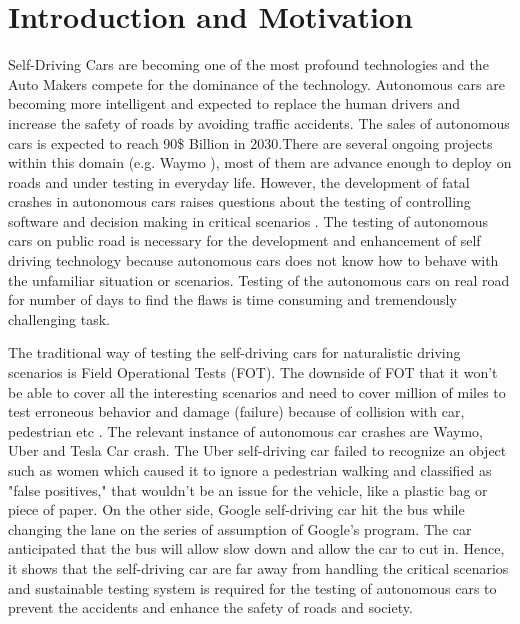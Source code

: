 \section{Introduction and Motivation}
Self-Driving Cars are becoming one of the most profound technologies and the Auto Makers compete for the dominance of the technology\cite{hancock2019future}. Autonomous cars are becoming more intelligent and expected to replace the human drivers and increase the safety of roads by avoiding traffic accidents. The sales of autonomous cars is expected to reach 90\$ Billion in 2030\cite{bertoncello2015ten}\cite{keeney2017mobility}.There are several ongoing projects within this domain (e.g. Waymo \cite{teoh2017rage}), most of them are advance enough to deploy on roads and under testing in everyday life. However, the development of fatal crashes in autonomous cars raises questions about the testing of controlling software and decision making in critical scenarios \cite{zhou2017identification}. The testing of autonomous cars on public road is necessary for the development and enhancement of self driving technology because autonomous cars does not know how to behave with the unfamiliar situation or scenarios. Testing of the autonomous cars on real road for number of days to find the flaws is time consuming and tremendously challenging task. 


The traditional way of testing the self-driving cars for naturalistic driving scenarios is Field Operational Tests (FOT). The downside of FOT that it won't be able to cover all the interesting scenarios and need to cover million of miles to test erroneous behavior and damage (failure) because of collision with car, pedestrian etc \cite{kalra2016driving}. The relevant instance of autonomous car crashes are Waymo, Uber and Tesla Car crash. The Uber self-driving car \cite{levin2018uber} \cite{kohli2019enabling} failed to recognize an object such as women
which caused it to ignore a pedestrian walking and classified as "false positives," that wouldn't be an issue for the vehicle, like a plastic bag or piece of paper. On the other side, Google self-driving car \cite{muir2016google} hit the bus while changing the lane on the series of assumption of Google's program. The car anticipated that the bus will allow slow down and allow the car to cut in. Hence, it shows that the self-driving car are far away from handling the critical scenarios and sustainable testing system is required for the testing of autonomous cars to prevent the accidents and enhance the safety of roads and society. 

